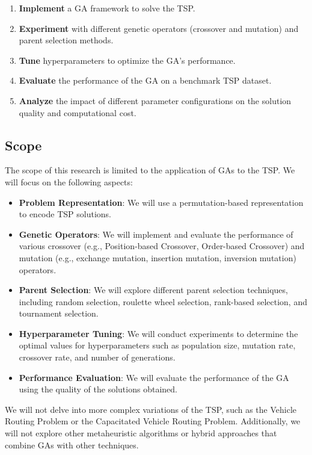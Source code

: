 \documentclass[11pt]{article}
\begin{document}
\begin{enumerate}
    \item \textbf{Implement} a GA framework to solve the TSP.
    \item \textbf{Experiment} with different genetic operators (crossover and mutation) and parent selection methods.
    \item \textbf{Tune} hyperparameters to optimize the GA's performance.
    \item \textbf{Evaluate} the performance of the GA on a benchmark TSP dataset.
    \item \textbf{Analyze} the impact of different parameter configurations on the solution quality and computational cost.
\end{enumerate}

\subsection{Scope}

The scope of this research is limited to the application of GAs to the TSP. We will focus on the following aspects:

\begin{itemize}
    \item \textbf{Problem Representation}: We will use a permutation-based representation to encode TSP solutions.
    \item \textbf{Genetic Operators}: We will implement and evaluate the performance of various crossover (e.g., Position-based Crossover, Order-based Crossover) and mutation (e.g., exchange mutation, insertion mutation, inversion mutation) operators.
    \item \textbf{Parent Selection}: We will explore different parent selection techniques, including random selection, roulette wheel selection, rank-based selection, and tournament selection.
    \item \textbf{Hyperparameter Tuning}: We will conduct experiments to determine the optimal values for hyperparameters such as population size, mutation rate, crossover rate, and number of generations.
    \item \textbf{Performance Evaluation}: We will evaluate the performance of the GA using the quality of the solutions obtained. 
\end{itemize}

We will not delve into more complex variations of the TSP, such as the Vehicle Routing Problem or the Capacitated Vehicle Routing Problem. Additionally, we will not explore other metaheuristic algorithms or hybrid approaches that combine GAs with other techniques.
\end{document}
